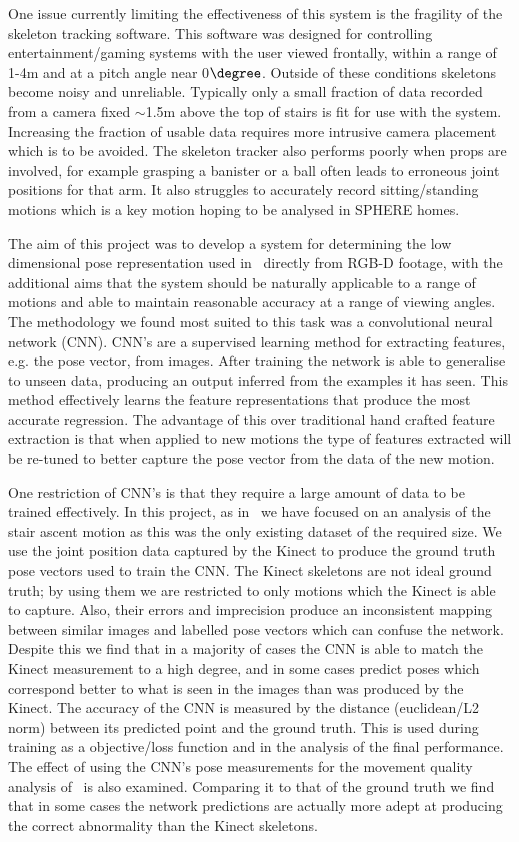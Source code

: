 \documentclass[11pt]{article} %
\begin{document}
One issue currently limiting the effectiveness of this system is the fragility of the skeleton tracking software. This software was designed for controlling entertainment/gaming systems with the user viewed frontally, within a range of 1-4m and at a pitch angle near 0$\degree$. Outside of these conditions skeletons become noisy and unreliable. Typically only a small fraction of data recorded from a camera fixed $\sim$1.5m above the top of stairs is fit for use with the system. Increasing the fraction of usable data requires more intrusive camera placement which is to be avoided. The skeleton tracker also performs poorly when props are involved, for example grasping a banister or a ball often leads to erroneous joint positions for that arm. It also struggles to accurately record sitting/standing motions which is a key motion hoping to be analysed in SPHERE homes.

The aim of this project was to develop a system for determining the low dimensional pose representation used in~\cite{Paiement} directly from RGB-D footage, with the additional aims that the system should be naturally applicable to a range of motions and able to maintain reasonable accuracy at a range of viewing angles. The methodology we found most suited to this task was a convolutional neural network (CNN). CNN's are a supervised learning method for extracting features, e.g. the pose vector, from images. After training the network is able to generalise to unseen data, producing an output inferred from the examples it has seen. This method effectively learns the feature representations that produce the most accurate regression. The advantage of this over traditional hand crafted feature extraction is that when applied to new motions the type of features extracted will be re-tuned to better capture the pose vector from the data of the new motion.

One restriction of CNN's is that they require a large amount of data to be trained effectively. In this project, as in~\cite{Paiement,Tao} we have focused on an analysis of the stair ascent motion as this was the only existing dataset of the required size. We use the joint position data captured by the Kinect to produce the ground truth pose vectors used to train the CNN. The Kinect skeletons are not ideal ground truth; by using them we are restricted to only motions which the Kinect is able to capture. Also, their errors and imprecision produce an inconsistent mapping between similar images and labelled pose vectors which can confuse the network. Despite this we find that in a majority of cases the CNN is able to match the Kinect measurement to a high degree, and in some cases predict poses which correspond better to what is seen in the images than was produced by the Kinect. The accuracy of the CNN is measured by the distance (euclidean/L2 norm) between its predicted point and the ground truth. This is used during training as a objective/loss function and in the analysis of the final performance. The effect of using the CNN's pose measurements for the movement quality analysis of~\cite{Paiement,Tao} is also examined. Comparing it to that of the ground truth we find that in some cases the network predictions are actually more adept at producing the correct abnormality than the Kinect skeletons.
\end{document}
